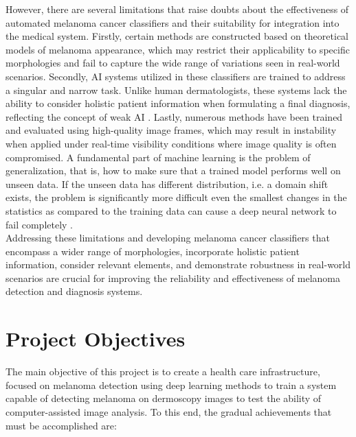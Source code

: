 However, there are several limitations that raise doubts about the effectiveness of automated melanoma cancer classifiers and their suitability for integration into the medical system. Firstly, certain methods are constructed based on theoretical models of melanoma appearance, which may restrict their applicability to specific morphologies and fail to capture the wide range of variations seen in real-world scenarios. Secondly, AI systems utilized in these classifiers are trained to address a singular and narrow task. Unlike human dermatologists, these systems lack the ability to consider holistic patient information when formulating a final diagnosis, reflecting the concept of weak AI \cite{WeakAI}. Lastly, numerous methods have been trained and evaluated using high-quality image frames, which may result in instability when applied under real-time visibility conditions where image quality is often compromised. A fundamental part of machine learning is the problem of generalization, that
is, how to make sure that a trained model performs well on unseen data. If the
unseen data has different distribution, i.e. a domain shift exists, the problem is
significantly more difficult even the smallest changes in the statistics
as compared to the training data can cause a deep neural network to fail completely \cite{DomainShift}. \\

Addressing these limitations and developing melanoma cancer classifiers that encompass a wider range of morphologies, incorporate holistic patient information, consider relevant elements, and demonstrate robustness in real-world scenarios are crucial for improving the reliability and effectiveness of melanoma detection and diagnosis systems. \\

\section{Project Objectives}

The main objective of this project is to create a health care infrastructure, focused on melanoma detection using deep learning methods to train
a system capable of detecting melanoma on dermoscopy images to test the ability
of computer-assisted image analysis. To this end, the gradual achievements
that must be accomplished are:

